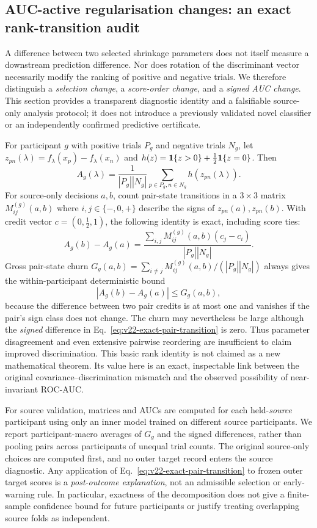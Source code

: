 \subsection{AUC-active regularisation changes: an exact rank-transition audit}
\label{sec:v22-rank-transitions}
A difference between two selected shrinkage parameters does not itself
measure a downstream prediction difference. Nor does rotation of the
discriminant vector necessarily modify the ranking of positive and negative
trials. We therefore distinguish a \emph{selection change}, a
\emph{score-order change}, and a \emph{signed AUC change}. This section
provides a transparent diagnostic identity and a falsifiable source-only
analysis protocol; it does not introduce a previously validated novel
classifier or an independently confirmed predictive certificate.

For participant $g$ with positive trials $P_g$ and negative trials $N_g$,
let $z_{pn}(\lambda)=f_\lambda(x_p)-f_\lambda(x_n)$ and
$h(z)={\bf1}\{z>0\}+\tfrac12{\bf1}\{z=0\}$. Then
\[
  A_g(\lambda)=\frac{1}{|P_g||N_g|}
     \sum_{p\in P_g,n\in N_g}h(z_{pn}(\lambda)).
\]
For source-only decisions $a,b$, count pair-state transitions in a
$3\times3$ matrix $M_{ij}^{(g)}(a,b)$ where
$i,j\in\{-,0,+\}$ describe the signs of $z_{pn}(a),z_{pn}(b)$.
With credit vector $c=(0,\tfrac12,1)$, the following identity is exact,
including score ties:
\begin{equation}
  A_g(b)-A_g(a)=
  \frac{\sum_{i,j}M_{ij}^{(g)}(a,b)(c_j-c_i)}
       {|P_g||N_g|}.
  \label{eq:v22-exact-pair-transition}
\end{equation}
Gross pair-state churn
$G_g(a,b)=\sum_{i\ne j}M_{ij}^{(g)}(a,b)/(|P_g||N_g|)$
always gives the within-participant deterministic bound
\[
 \left|A_g(b)-A_g(a)\right|\le G_g(a,b),
\]
because the difference between two pair credits is at most one and
vanishes if the pair's sign class does not change.
The churn may nevertheless be large although the \emph{signed}
difference in Eq.~\eqref{eq:v22-exact-pair-transition} is zero. Thus parameter
disagreement and even extensive pairwise reordering are insufficient to
claim improved discrimination. This basic rank identity is not claimed
as a new mathematical theorem. Its value here is an exact, inspectable
link between the original covariance--discrimination mismatch and the
observed possibility of near-invariant ROC-AUC.

For source validation, matrices and AUCs are computed for each
held-\emph{source} participant using only an inner model trained on
different source participants. We report participant-macro averages of
$G_g$ and the signed differences, rather than pooling pairs across
participants of unequal trial counts. The original source-only choices
are computed first, and no outer target record enters the source
diagnostic. Any application of Eq.~\eqref{eq:v22-exact-pair-transition}
to frozen outer target scores is a \emph{post-outcome explanation}, not
an admissible selection or early-warning rule. In particular, exactness
of the decomposition does not give a finite-sample confidence bound for
future participants or justify treating overlapping source folds as
independent.

